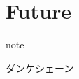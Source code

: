 \documentclass[xcolor=pdftex,dvipsnames,table]{beamer}
\begin{document}
\section{Future}

\begin{frame}

    \vspace{\fill}
\begin{beamercolorbox}[center,shadow=true,rounded=true]{note} 
  \huge \begin{CJK}{UTF8}{min}ダンケシェーン\end{CJK}
\end{beamercolorbox}

    \vspace{\fill}
\end{frame} 
%
\end{document}
